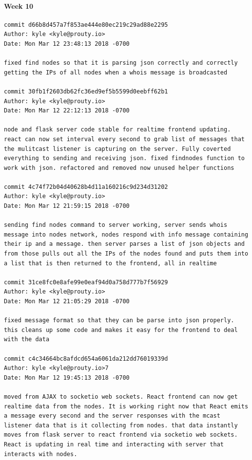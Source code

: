 \documentclass[draftclsnofoot, onecolumn, compsoc, 10pt]{IEEEtran}
\begin{document}
\paragraph{Week 10}
\begin{lstlisting}
commit d66b8d457a7f853ae444e80ec219c29ad88e2295 
Author: kyle <kyle@prouty.io> 
Date: Mon Mar 12 23:48:13 2018 -0700 

fixed find nodes so that it is parsing json correctly and correctly getting the IPs of all nodes when a whois message is broadcasted 

commit 30fb1f2603db62fc36ed9ef5b5599d0eebff62b1 
Author: kyle <kyle@prouty.io> 
Date: Mon Mar 12 22:12:13 2018 -0700 

node and flask server code stable for realtime frontend updating. react can now set interval every second to grab list of messages that the mulitcast listener is capturing on the server. Fully coverted everything to sending and receiving json. fixed findnodes function to work with json. refactored and removed now unused helper functions 

commit 4c74f72b04d40628b4d11a160216c9d234d31202 
Author: kyle <kyle@prouty.io> 
Date: Mon Mar 12 21:59:15 2018 -0700 

sending find nodes command to server working, server sends whois message into nodes network, nodes respond with info message containing their ip and a message. then server parses a list of json objects and from those pulls out all the IPs of the nodes found and puts them into a list that is then returned to the frontend, all in realtime 

commit 31ce8fc0e8afe99e0eaf94d0a758d777b7f56929 
Author: kyle <kyle@prouty.io> 
Date: Mon Mar 12 21:05:29 2018 -0700 

fixed message format so that they can be parse into json properly. this cleans up some code and makes it easy for the frontend to deal with the data 

commit c4c34664bc8afdcd654a6061da212dd76019339d 
Author: kyle <kyle@prouty.io>7 
Date: Mon Mar 12 19:45:13 2018 -0700 

moved from AJAX to socketio web sockets. React frontend can now get realtime data from the nodes. It is working right now that React emits a message every second and the server responses with the mcast listener data that is it collecting from nodes. that data instantly moves from flask server to react frontend via socketio web sockets. React is updating in real time and interacting with server that interacts with nodes. 


\end{lstlisting}
\end{document}
